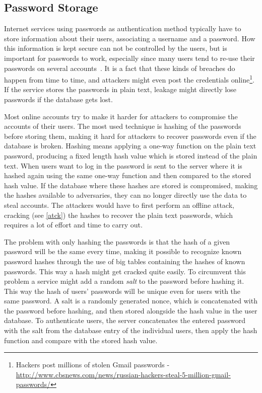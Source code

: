 \subsection{Password Storage}\label{pw-storage}
Internet services using passwords as authentication method typically have to store information about their users, associating a username and a password. How this information is kept secure can not be controlled by the users, but is important for passwords to work, especially since many users tend to re-use their passwords on several accounts~\cite{domino-effect}. It is a fact that these kinds of breaches do happen from time to time, and attackers might even post the credentials online\footnote{Hackers post millions of stolen Gmail passwords - \url{http://www.cbsnews.com/news/russian-hackers-steal-5-million-gmail-passwords/} }. If the service stores the passwords in plain text, leakage might directly lose passwords if the database gets lost.
\par Most online accounts try to make it harder for attackers to compromise the accounts of their users. The most used technique is hashing of the passwords before storing them, making it hard for attackers to recover passwords even if the database is broken. Hashing means applying a one-way function on the plain text password, producing a fixed length hash value which is stored instead of the plain text. When users want to log in the password is sent to the server where it is hashed again using the same one-way function and then compared to the stored hash value. If the database where these hashes are stored is compromised, making the hashes available to adversaries, they can no longer directly use the data to steal accounts. The attackers would have to first perform an offline attack, cracking (see \autoref{atck}) the hashes to recover the plain text passwords, which requires a lot of effort and time to carry out. 
\par The problem with only hashing the passwords is that the hash of a given password will be the same every time, making it possible to recognize known password hashes through the use of big tables containing the hashes of known passwords. This way a hash might get cracked quite easily. To circumvent this problem a service might add a random \emph{salt} to the password before hashing it. This way the hash of users' passwords will be unique even for users with the same password. A salt is a randomly generated nonce, which is concatenated with the password before hashing, and then stored alongside the hash value in the user database. To authenticate users, the server concatenates the entered password with the salt from the database entry of the individual users, then apply the hash function and compare with the stored hash value.

